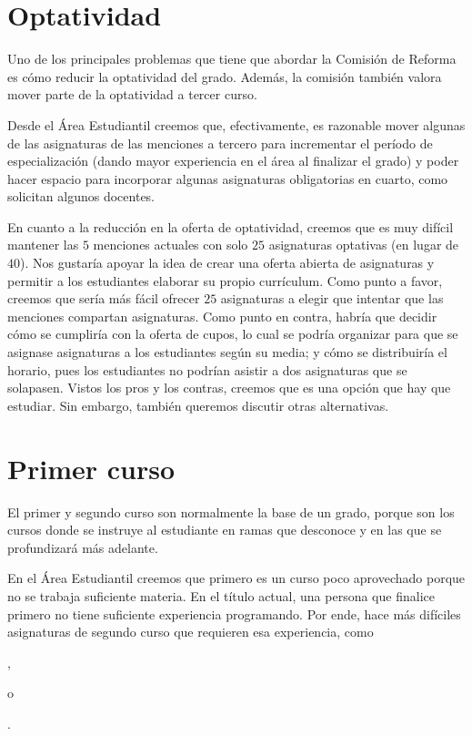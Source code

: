
\section{Optatividad}

Uno de los principales problemas que tiene que abordar
la Comisión de Reforma
es cómo reducir la optatividad del grado. %
Además, la comisión también valora mover parte de la optatividad a tercer curso.

Desde el Área Estudiantil creemos que, efectivamente,
es razonable mover algunas de las asignaturas de las menciones a tercero para
incrementar el período de especialización
(dando mayor experiencia en el área al finalizar el grado)
y poder hacer espacio para
incorporar algunas asignaturas obligatorias en cuarto,
como solicitan algunos docentes.

En cuanto a la reducción en la oferta de optatividad,
creemos que es muy difícil mantener las $5$ menciones actuales
con solo $25$ asignaturas optativas (en lugar de $40$).
Nos gustaría apoyar la idea de crear una oferta abierta de asignaturas
y permitir a los estudiantes elaborar su propio currículum.
Como punto a favor, creemos que
sería más fácil ofrecer $25$ asignaturas a elegir
que intentar que las menciones compartan asignaturas.
Como punto en contra, habría que decidir
cómo se cumpliría con la oferta de cupos,
lo cual se podría organizar para que
se asignase asignaturas a los estudiantes según su media;
y cómo se distribuiría el horario,
pues los estudiantes no podrían asistir a dos asignaturas que se solapasen.
Vistos los pros y los contras, creemos que es una opción que hay que estudiar.
Sin embargo, también queremos discutir otras alternativas.

\section{Primer curso}\label{sec:approach-first-course}

El primer y segundo curso son normalmente la base de un grado,
porque son los cursos donde se instruye al estudiante en ramas que desconoce y
en las que se profundizará más adelante.

En el Área Estudiantil creemos que primero es un curso poco aprovechado
porque no se trabaja suficiente materia.
En el título actual, una persona que finalice primero
no tiene suficiente experiencia programando.
Por ende, hace más difíciles asignaturas de segundo curso
que requieren esa experiencia, como
\subject{Algoritmos y Estructuras de Datos},
\subject{Programación Orientada a Objetos} o
\subject{Programación Concurrente y Distribuida}.

